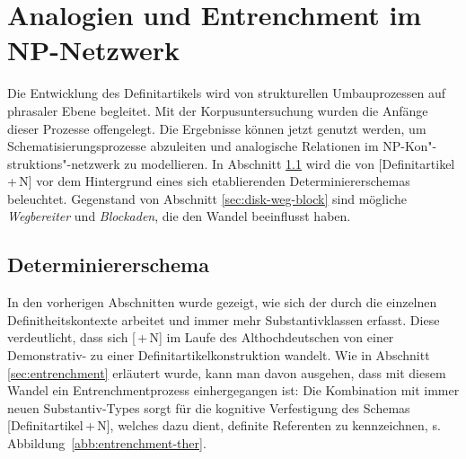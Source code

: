 \section{Analogien und Entrenchment im NP-Netzwerk} \label{sec:disk-ana-entrench}

Die Entwicklung des Definitartikels  wird von strukturellen Umbauprozessen auf phrasaler Ebene begleitet. Mit der Korpusuntersuchung  wurden die Anfänge dieser Prozesse offengelegt. Die Ergebnisse können jetzt genutzt werden, um Schematisierungsprozesse  abzuleiten und analogische Relationen  im NP-Kon"-struktions"-netzwerk  zu modellieren. In Abschnitt \ref{sec:disk-schema} wird die  von  [Definitartikel\,+\,N] vor dem Hintergrund eines sich etablierenden Determiniererschemas  beleuchtet. Gegenstand von Abschnitt \ref{sec:disk-weg-block} sind mögliche \textit{Wegbereiter} und \textit{Blockaden}, die den Wandel beeinflusst haben.  

\subsection{Determiniererschema} \label{sec:disk-schema}

In den vorherigen Abschnitten wurde gezeigt, wie sich der  durch die einzelnen Definitheitskontexte  arbeitet und immer mehr Substantivklassen erfasst. Diese  verdeutlicht, dass sich [\,+\,N] im Laufe des Althochdeutschen von einer Demonstrativ-  zu einer Definitartikelkonstruktion wandelt. 
Wie in Abschnitt \ref{sec:entrenchment} erläutert wurde, kann man davon ausgehen, dass mit diesem Wandel ein Entrenchmentprozess  einhergegangen ist: Die Kombination mit immer neuen Substantiv-Types sorgt für die kognitive Verfestigung des Schemas  [Definitartikel\,+\,N], welches dazu dient, definite Referenten zu kennzeichnen, s. Abbildung~\ref{abb:entrenchment-ther}. 

